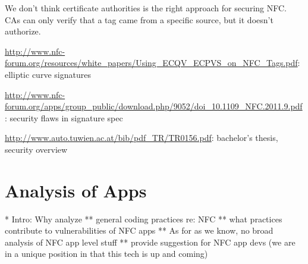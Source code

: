 \documentclass[12pt]{article}
\begin{document}
%
%
%
%

We don't think certificate authorities is the right approach for securing NFC. CAs can only verify that a tag came from a specific source, but it doesn't authorize.

\url{http://www.nfc-forum.org/resources/white_papers/Using_ECQV_ECPVS_on_NFC_Tags.pdf}: elliptic curve signatures

\url{http://www.nfc-forum.org/apps/group_public/download.php/9052/doi_10.1109_NFC.2011.9.pdf}: security flaws in signature spec

\url{http://www.auto.tuwien.ac.at/bib/pdf_TR/TR0156.pdf}: bachelor's thesis, security overview

\section{Analysis of Apps}
* Intro: Why analyze
** general coding practices re: NFC
** what practices contribute to vulnerabilities of NFC apps
** As for as we know, no broad analysis of NFC app level stuff
** provide suggestion for NFC app devs (we are in a unique position in that this tech is up and coming)
\end{document}
